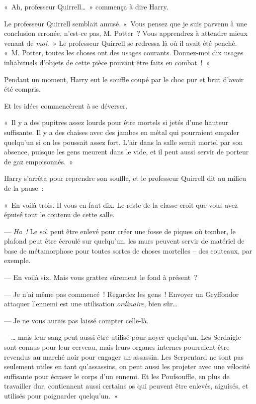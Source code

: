«~Ah, professeur Quirrell…~» commença à dire Harry.

Le professeur Quirrell semblait amusé. «~Vous pensez que je suis parvenu à une conclusion erronée, n'est-ce pas, M. Potter~? Vous apprendrez à attendre mieux venant de \emph{moi}.~» Le professeur Quirrell se redressa là où il avait été penché. «~M. Potter, toutes les choses ont des usages courants. Donnez-moi dix usages inhabituels d'objets de cette pièce pouvant être faits en combat~!~»

Pendant un moment, Harry eut le souffle coupé par le choc pur et brut d'avoir été compris.

Et les idées commencèrent à se déverser.

«~Il y a des pupitres assez lourds pour être mortels si jetés d'une hauteur suffisante. Il y a des chaises avec des jambes en métal qui pourraient empaler quelqu'un si on les poussait assez fort. L'air dans la salle serait mortel par son absence, puisque les gens meurent dans le vide, et il peut aussi servir de porteur de gaz empoisonnés.~»

Harry s'arrêta pour reprendre son souffle, et le professeur Quirrell dit au milieu de la pause~:

«~En voilà trois. Il vous en faut dix. Le reste de la classe croit que vous avez épuisé tout le contenu de cette salle.

--- \emph{Ha~!} Le sol peut être enlevé pour créer une fosse de piques où tomber, le plafond peut être écroulé sur quelqu'un, les murs peuvent servir de matériel de base de métamorphose pour toutes sortes de choses mortelles -- des couteaux, par exemple.

--- En voilà six. Mais vous grattez sûrement le fond à présent~?

--- Je n'ai même pas commencé~! Regardez les gens~! Envoyer un Gryffondor attaquer l'ennemi est une utilisation \emph{ordinaire}, bien sûr…

--- Je ne vous aurais pas laissé compter celle-là.

---… mais leur sang peut aussi être utilisé pour noyer quelqu'un. Les Serdaigle sont connus pour leur cerveau, mais leurs organes internes pourraient être revendus au marché noir pour engager un assassin. Les Serpentard ne sont pas seulement utiles en tant qu'assassins, on peut aussi les projeter avec une vélocité suffisante pour écraser le corps d'un ennemi. Et les Poufsouffle, en plus de travailler dur, contiennent aussi certains os qui peuvent être enlevés, aiguisés, et utilisés pour poignarder quelqu'un.~»

